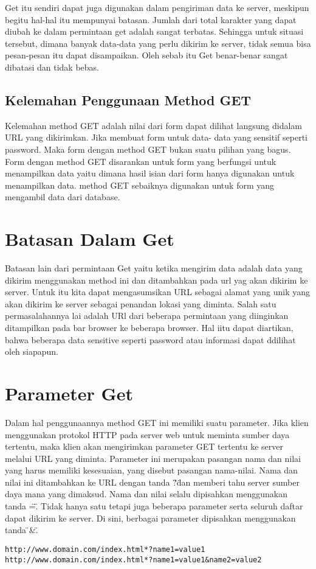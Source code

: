 Get itu sendiri dapat juga digunakan dalam pengiriman data ke server, meskipun begitu hal-hal itu mempunyai batasan. 
Jumlah dari total karakter yang dapat diubah ke dalam permintaan get adalah sangat terbatas. Sehingga untuk situasi tersebut, dimana 
banyak data-data yang perlu dikirim  ke server, tidak semua bisa pesan-pesan itu dapat disampaikan. Oleh sebab itu Get benar-benar 
sangat dibatasi dan tidak bebas.

\subsection{Kelemahan Penggunaan Method GET}
Kelemahan method GET adalah nilai dari form dapat dilihat langsung didalam URL yang dikirimkan. Jika membuat form untuk data-
data yang  sensitif seperti password. Maka form  dengan method GET bukan suatu pilihan yang bagus. Form dengan method GET 
disarankan untuk form yang berfungsi untuk menampilkan data  yaitu dimana hasil isian dari form hanya digunakan untuk  
menampilkan data. method GET sebaiknya digunakan untuk form yang mengambil data dari database.

\section{Batasan Dalam Get}
Batasan lain dari permintaan Get yaitu ketika mengirim data adalah data yang dikirim menggunakan method ini dan ditambahkan pada url yag 
akan dikirim ke server. Untuk itu kita dapat mengasumsikan URL sebagai alamat yang unik yang akan dikirim ke server sebagai penandan 
lokasi yang diminta. Salah satu permasalahannya lai adalah URl dari beberapa permintaan yang diinginkan ditampilkan pada bar browser ke 
beberapa browser. Hal iitu dapat diartikan, bahwa beberapa data sensitive seperti password atau informasi dapat ddilihat oleh siapapun.

\section{Parameter Get}
Dalam hal penggunaannya method GET ini memiliki suatu parameter. Jika klien menggunakan protokol HTTP pada server web untuk meminta 
sumber daya tertentu, maka klien akan mengirimkan parameter GET tertentu ke server melalui URL yang diminta. Parameter ini merupakan 
pasangan nama dan nilai yang harus memiliki kesesuaian, yang disebut pasangan nama-nilai.
Nama dan nilai ini ditambahkan ke URL dengan tanda \"?\" dan memberi tahu server sumber daya mana yang dimaksud. Nama dan nilai selalu dipisahkan menggunakan tanda \"=\". Tidak hanya satu tetapi juga beberapa parameter serta seluruh daftar dapat dikirim ke server. Di sini, berbagai parameter dipisahkan menggunakan tanda \"&\".
\begin{verbatim}
http://www.domain.com/index.html*?name1=value1
http://www.domain.com/index.html*?name1=value1&name2=value2
\end{verbatim}

